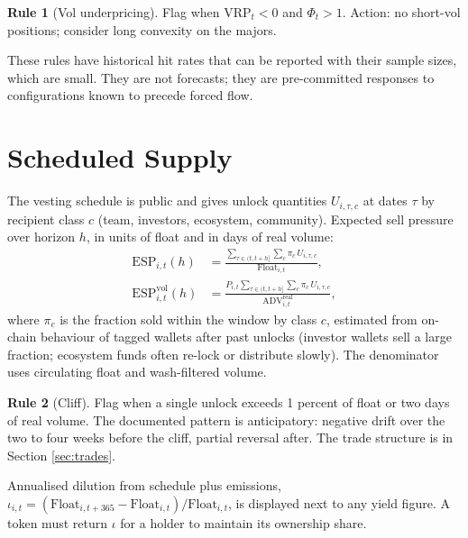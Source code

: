 \documentclass[11pt,a4paper]{article}
\theoremstyle{definition}
\newtheorem{rule_}{Rule}[section]
\begin{document}
\begin{rule_}[Vol underpricing]
Flag when $\mathrm{VRP}_t < 0$ and $\Phi_t > 1$. Action: no short-vol positions; consider long convexity on the majors.
\end{rule_}

These rules have historical hit rates that can be reported with their sample sizes, which are small. They are not forecasts; they are pre-committed responses to configurations known to precede forced flow.

\section{Scheduled Supply}\label{sec:supply}

The vesting schedule is public and gives unlock quantities $U_{i,\tau,c}$ at dates $\tau$ by recipient class $c$ (team, investors, ecosystem, community). Expected sell pressure over horizon $h$, in units of float and in days of real volume:
\begin{align}
\mathrm{ESP}_{i,t}(h) &= \frac{\sum_{\tau \in (t,t+h]} \sum_c \pi_c\, U_{i,\tau,c}}{\mathrm{Float}_{i,t}}, \\
\mathrm{ESP}^{\mathrm{vol}}_{i,t}(h) &= \frac{P_{i,t}\sum_{\tau \in (t,t+h]} \sum_c \pi_c\, U_{i,\tau,c}}{\mathrm{ADV}^{\mathrm{real}}_{i,t}},
\end{align}
where $\pi_c$ is the fraction sold within the window by class $c$, estimated from on-chain behaviour of tagged wallets after past unlocks (investor wallets sell a large fraction; ecosystem funds often re-lock or distribute slowly). The denominator uses circulating float and wash-filtered volume.

\begin{rule_}[Cliff]
Flag when a single unlock exceeds 1 percent of float or two days of real volume. The documented pattern is anticipatory: negative drift over the two to four weeks before the cliff, partial reversal after. The trade structure is in Section \ref{sec:trades}.
\end{rule_}

Annualised dilution from schedule plus emissions, $\iota_{i,t} = (\mathrm{Float}_{i,t+365} - \mathrm{Float}_{i,t})/\mathrm{Float}_{i,t}$, is displayed next to any yield figure. A token must return $\iota$ for a holder to maintain its ownership share.
\end{document}
